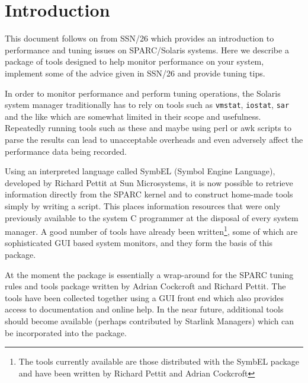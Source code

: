 \documentclass[11pt]{article}
\newcommand{\stardocinitials}  {SSN}
\newcommand{\stardocnumber}    {30.2}
\newcommand{\stardocname}{\stardocinitials /\stardocnumber}
\newenvironment{latexonly}{}{}
\newcommand{\xref}[3]{#1}
\begin{document}
\begin{latexonly}
   \setlength{\parskip}{0mm}
   \tableofcontents
   \setlength{\parskip}{\medskipamount}
   \markright{\stardocname}
\end{latexonly}

\newpage
\section{Introduction}

This document follows on from \xref{SSN/26}{ssn26}{} which provides an
introduction to performance and tuning issues on SPARC/Solaris systems. 
Here we describe a package of tools designed to help monitor performance 
on your system, implement some of the advice given in SSN/26 and provide 
tuning tips.

In order to monitor performance and perform tuning operations, the Solaris
system manager traditionally has to rely on tools such as {\tt{vmstat}}, 
{\tt{iostat}}, {\tt{sar}} and the like which are somewhat limited in their
scope and usefulness. Repeatedly running tools such as these and maybe
using perl or awk scripts to parse the results can lead to unacceptable
overheads and even adversely affect the performance data being recorded.

Using an interpreted language called SymbEL (Symbol Engine Language),
developed by Richard Pettit at Sun Microsystems, it is now possible to 
retrieve information directly from the SPARC kernel and to construct
home-made tools simply by writing a script. This places information 
resources that were only previously available to the system C programmer 
at the disposal of every system manager. A good number of tools have already
been written\footnote{The tools currently available are those distributed
with the SymbEL package and have been written by Richard Pettit and Adrian
Cockcroft}, some of which are sophisticated GUI based system monitors, and
they form the basis of this package.

At the moment the package is essentially a wrap-around for the SPARC tuning
rules and tools package written by Adrian Cockcroft and Richard Pettit. The
tools have been collected together using a GUI front end which also provides
access to documentation and online help. In the near future, additional tools
should become available (perhaps contributed by Starlink Managers) which
can be incorporated into the package.
\end{document}
